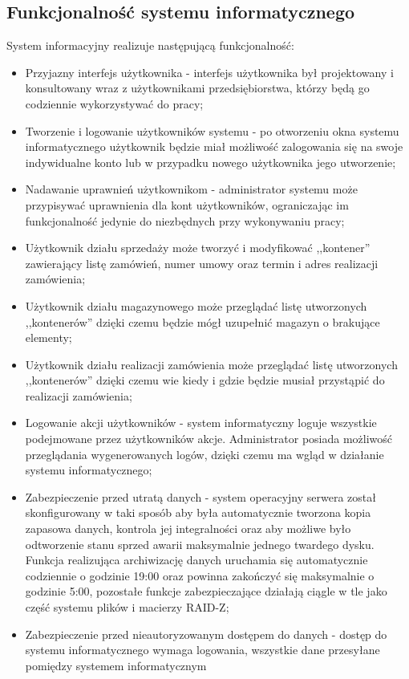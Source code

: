\documentclass[12pt,a4paper]{article}
\begin{document}
		\subsection{Funkcjonalność systemu informatycznego}		  
		\indent System informacyjny realizuje następującą funkcjonalność:
			\begin{itemize}
				\item Przyjazny interfejs użytkownika - interfejs użytkownika był projektowany i konsultowany wraz z użytkownikami przedsiębiorstwa, którzy będą go codziennie
					wykorzystywać do pracy;
				\item Tworzenie i logowanie użytkowników systemu - po otworzeniu okna systemu informatycznego użytkownik będzie miał możliwość zalogowania się na swoje indywidualne konto
					lub w przypadku nowego użytkownika jego utworzenie;
				\item Nadawanie uprawnień użytkownikom - administrator systemu może przypisywać uprawnienia dla kont użytkowników, ograniczając im funkcjonalność jedynie do niezbędnych
					przy wykonywaniu pracy; 
				\item Użytkownik działu sprzedaży może tworzyć i modyfikować ,,kontener'' zawierający listę zamówień, numer umowy oraz termin i adres realizacji zamówienia;
				\item Użytkownik działu magazynowego może przeglądać listę utworzonych ,,kontenerów'' dzięki czemu będzie mógł uzupełnić magazyn o brakujące elementy;
				\item Użytkownik działu realizacji zamówienia może przeglądać listę utworzonych ,,kontenerów'' dzięki czemu wie kiedy i gdzie będzie musiał przystąpić do realizacji zamówienia;
				\item Logowanie akcji użytkowników - system informatyczny loguje wszystkie podejmowane przez użytkowników akcje. Administrator posiada możliwość przeglądania
					wygenerowanych logów, dzięki czemu ma wgląd w działanie systemu informatycznego;  
				\item Zabezpieczenie przed utratą danych - system operacyjny serwera został skonfigurowany w taki sposób aby była automatycznie tworzona kopia zapasowa danych,
					kontrola jej integralności oraz aby możliwe było odtworzenie stanu sprzed awarii maksymalnie jednego twardego dysku.
					Funkcja realizująca archiwizację danych uruchamia się automatycznie codziennie o godzinie 19:00 oraz powinna zakończyć się maksymalnie o godzinie 5:00, pozostałe funkcje
					zabezpieczające działają ciągle w tle jako część systemu plików i macierzy RAID-Z;
				\item Zabezpieczenie przed nieautoryzowanym dostępem do danych - dostęp do systemu informatycznego wymaga logowania, wszystkie dane przesyłane pomiędzy systemem informatycznym

\end{itemize}
\end{document}
